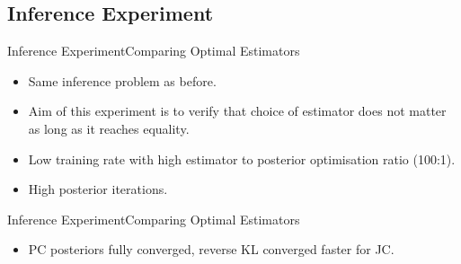\documentclass{beamer}
\begin{document}
\subsection{Inference Experiment}
\begin{frame}{Inference Experiment}{Comparing Optimal Estimators}
\begin{itemize}
\item Same inference problem as before.
\item Aim of this experiment is to verify that choice of estimator does not matter as long as it reaches equality.
\item Low training rate with high estimator to posterior optimisation ratio (100:1).
\item High posterior iterations.
\end{itemize}
\end{frame}
\begin{frame}{Inference Experiment}{Comparing Optimal Estimators}
\begin{table}[h]
\end{table}
\begin{itemize}
\item PC posteriors fully converged, reverse KL converged faster for JC.
\end{itemize}
\end{frame}
\end{document}
